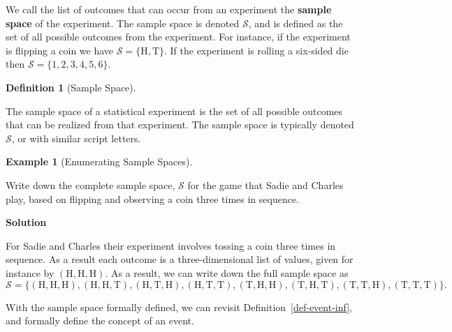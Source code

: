 \documentclass[
  letterpaper,
  DIV=11,
  numbers=noendperiod]{scrreprt}
\theoremstyle{definition}
\theoremstyle{definition}
\newtheorem{example}{Example}[chapter]
\theoremstyle{definition}
\newtheorem{definition}{Definition}[chapter]
\theoremstyle{remark}
\begin{document}
We call the list of outcomes that can occur from an experiment the
\textbf{sample space} of the experiment. The sample space is denoted
\(\mathcal{S}\), and is defined as the set of all possible outcomes from
the experiment. For instance, if the experiment is flipping a coin we
have \(\mathcal{S} = \{\text{H}, \text{T}\}\). If the experiment is
rolling a six-sided die then \(\mathcal{S} = \{1,2,3,4,5,6\}\).

\begin{definition}[Sample
Space]\protect\hypertarget{def-sample-space}{}\label{def-sample-space}

The sample space of a statistical experiment is the set of all possible
outcomes that can be realized from that experiment. The sample space is
typically denoted \(\mathcal{S}\), or with similar script letters.

\end{definition}

\begin{example}[Enumerating Sample
Spaces]\protect\hypertarget{exm-sample-space-basic}{}\label{exm-sample-space-basic}

Write down the complete sample space, \(\mathcal{S}\) for the game that
Sadie and Charles play, based on flipping and observing a coin three
times in sequence.

\begin{tcolorbox}[enhanced jigsaw, colback=white, colframe=quarto-callout-color-frame, arc=.35mm, leftrule=.75mm, rightrule=.15mm, opacityback=0, breakable, bottomrule=.15mm, left=2mm, toprule=.15mm]

\vspace{-3mm}\textbf{Solution}\vspace{3mm}

For Sadie and Charles their experiment involves tossing a coin three
times in sequence. As a result each outcome is a three-dimensional list
of values, given for instance by \((\text{H},\text{H},\text{H})\). As a
result, we can write down the full sample space as
\[\mathcal{S} = \{(\text{H},\text{H},\text{H}), (\text{H},\text{H},\text{T}), (\text{H},\text{T},\text{H}), (\text{H},\text{T},\text{T}), (\text{T},\text{H},\text{H}), (\text{T},\text{H},\text{T}), (\text{T},\text{T},\text{H}), (\text{T},\text{T},\text{T})\}.\]

\end{tcolorbox}

\end{example}

With the sample space formally defined, we can revisit
Definition~\ref{def-event-inf}, and formally define the concept of an
event.
\end{document}
